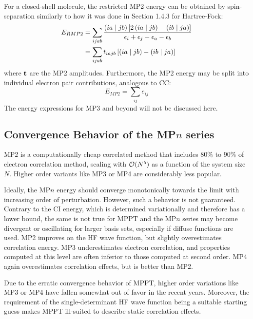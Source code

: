 \noindent For a closed-shell molecule, the restricted MP2 energy can be obtained by spin-separation similarly to how it was done in Section 1.4.3 for Hartree-Fock:
\begin{equation}
\begin{split}
E_{RMP2} &= \sum_{ijab} \frac{\left( ia \mid jb \right)\left[2\left( ia \mid jb \right) - \left( ib \mid ja \right) \right]}{\epsilon_i + \epsilon_j - \epsilon_a - \epsilon_b} \\
&= \sum_{ijab} t_{iajb} \left[\left( ia \mid jb \right) - \left( ib \mid ja \right) \right]
\end{split}
\label{eq:RMP2}
\end{equation}
\noindent where $\mathbf{t}$ are the MP2 amplitudes. Furthermore, the MP2 energy may be split into individual electron pair contributions, analogous to CC:
\begin{equation}
E_{MP2} = \sum_{ij} e_{ij}
\end{equation}
\noindent The energy expressions for MP3 and beyond will not be discussed here.

\subsection{Convergence Behavior of the MP$n$ series}

MP2 is a computationally cheap correlated method that includes 80\% to 90\% of electron correlation method, scaling with $\mathcal{O}(N^{5})$ as a function of the system size $N$. Higher order variants like MP3 or MP4 are considerably less popular. 

Ideally, the MP$n$ energy should converge monotonically towards the limit with increasing order of perturbation. However, such a behavior is not guaranteed. Contrary to the CI energy, which is determined variationally and therefore has a lower bound, the same is not true for MPPT and the MP$n$ series may become divergent or oscillating for larger basis sets, especially if diffuse functions are used. MP2 improves on the HF wave function, but slightly overestimates correlation energy. MP3 underestimates electron correlation, and properties computed at this level are often inferior to those computed at second order. MP4 again overestimates correlation effects, but is better than MP2.

Due to the erratic convergence behavior of MPPT, higher order variations like MP3 or MP4 have fallen somewhat out of favor in the recent years. Moreover, the requirement of the single-determinant HF wave function being a suitable starting guess makes MPPT ill-suited to describe static correlation effects.  

